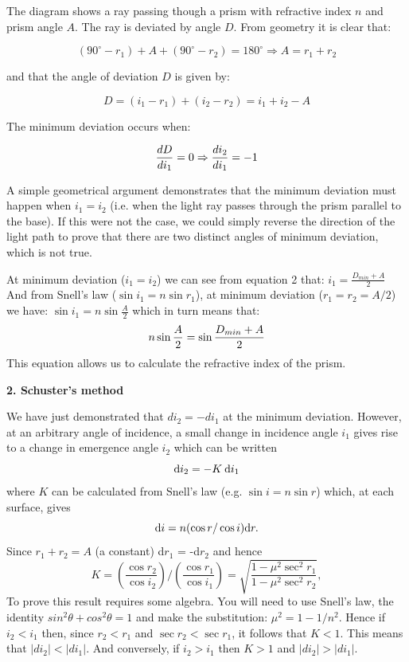 \documentclass[12pt]{article}
\newcommand{\degree}{^\circ}
\begin{document}
The diagram shows a ray passing though a prism with refractive index $n$ and prism angle $A$. The ray is deviated by angle $D$. From geometry it is clear that:\\
\begin{center}
\begin{equation}
(90 \degree - r_1) + A + (90\degree - r_2)=180\degree 
\Rightarrow A=r_1 + r_2
\end{equation}
\end{center}
and that the angle of deviation $D$ is given by:
\begin{center}
\begin{equation}
D=(i_1 - r_1) + (i_2 - r_2) = i_1 + i_2 - A
\end{equation}
\end{center}
The minimum deviation occurs when:
\begin{center}
\begin{equation}
{\Large
\frac{dD}{d i_1}=0 \Rightarrow \frac{d i_2}{d i_1}=-1
}
\end{equation}
\end{center}

A simple geometrical argument demonstrates that the minimum deviation must happen when $i_1 = i_2$ (i.e. when the light ray passes through the prism parallel to the base). If this were not the case, we could simply reverse the direction of the light path to prove that there are two distinct angles of minimum deviation, which is not true.

At minimum deviation ($i_1=i_2$) we can see from equation 2 that: $i_1=\frac{D_{min}+A}{2}$\\

And from Snell's law ($\sin i_1=n\sin r_1$), at minimum deviation ($r_1=r_2=A/2$) we have:
$\sin i_1=n\sin\frac{A}{2}$ which in turn means that:
\begin{equation}
{\Large
n\sin\frac{A}{2}=\sin\frac{D_{min}+A}{2}
}
\end{equation}
This equation allows us to calculate the refractive index of the prism.
\newpage
\begin{center}
{\large{\bf 2. Schuster's method}}
\end{center}
We have just demonstrated that $d i_2 = -d i_1$ at the minimum deviation. However, at an arbitrary angle of incidence, a small change in incidence angle $i_1$ gives rise to a change in emergence angle $i_2$ which can be written
\[   \mbox{\rm d}i_2 = - K\:\mbox{\rm d}i_1    \]
where $K$ can be calculated from Snell's law (e.g. $\sin i =n \sin r $) which, at each surface, gives
\[  \mbox{\rm d}i = n (\cos r/\cos i)\mbox{\rm d}r.   \]
Since $r_1 + r_2 = A$ (a constant) d$r_1$ = -d$r_2$ and hence
\[  K = \left(\frac{\cos r_2}{\cos i_2}\right) / 
    \left(\frac{\cos r_1}{\cos i_1}\right)       =
     \sqrt{\frac{1-\mu^2\sec^2 r_1}{1-\mu^2\sec^2 r_2}},  \]
To prove this result requires some algebra. You will need to use Snell's law, the identity $sin^2 \theta + cos^2\theta =1$ and make the substitution: $\mu^2 =  1 - 1/n^2$. Hence if $i_2<i_1$ then, since $r_2<r_1$ and $\sec r_2 <  \sec r_1$, it follows that $K<1$. This means that $|di_2|<|di_1|$. And conversely, if $i_2>i_1$ then $K>1$ and $|di_2|>|di_1|$.
\end{document}
